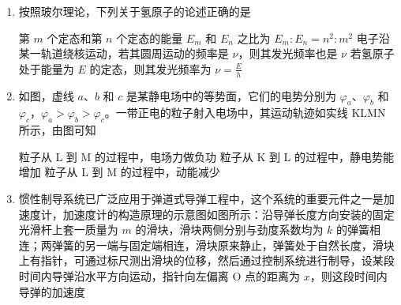 \documentclass[\gkver]{gaokaozhenti}
\begin{document}
\begin{enumerate}
{因为 $\overline{ab}=2\overline{bc}$，所以 $W_{2}=2W_{1}$，故 B 正确。
}

\item
按照玻尔理论，下列关于氢原子的论述正确的是

{第 $m$ 个定态和第 $n$ 个定态的能量 $E_{m}$ 和 $E_{n}$ 之比为 $E_{m}:E_{n} = n^{2}:m^{2}$}
{电子沿某一轨道绕核运动，若其圆周运动的频率是 $\nu$，则其发光频率也是 $\nu$}
{若氢原子处于能量为 $E$ 的定态，则其发光频率为 $\nu = \frac{E}{h}$}


\item
如图，虚线 $a$、$b$ 和 $c$ 是某静电场中的等势面，它们的电势分别为 $\varphi_{a}$、$\varphi_{b}$ 和 $\varphi_{c}$，$\varphi_{a} > \varphi_{b} > \varphi_{c}$。一带正电的粒子射入电场中，其运动轨迹如实线 KLMN 所示，由图可知

\onepicture[h=4.72cm]{}

{粒子从 L 到 M 的过程中，电场力做负功}
{粒子从 K 到 L 的过程中，静电势能增加}
{粒子从 L 到 M 的过程中，动能减少}


\item
惯性制导系统已广泛应用于弹道式导弹工程中，这个系统的重要元件之一是加速度计，加速度计的构造原理的示意图如图所示：沿导弹长度方向安装的固定光滑杆上套一质量为 $m$ 的滑块，滑块两侧分别与劲度系数均为 $k$ 的弹簧相连；两弹簧的另一端与固定端相连，滑块原来静止，弹簧处于自然长度，滑块上有指针，可通过标尺测出滑块的位移，然后通过控制系统进行制导，设某段时间内导弹沿水平方向运动，指针向左偏离 O 点的距离为 $x$，则这段时间内导弹的加速度


\end{enumerate}
\end{document}
